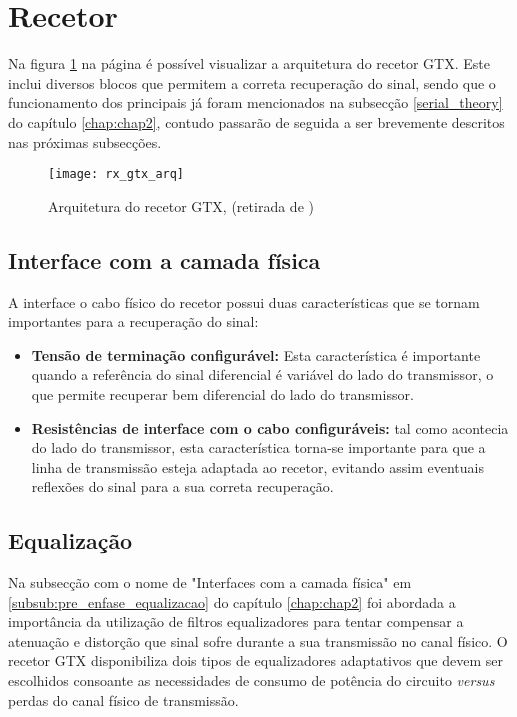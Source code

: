 \section{Recetor} \label{sec:_rx_gtx}
Na figura \ref{fig:gtx_rx_arq} na página \pageref{fig:gtx_rx_arq} é possível visualizar a arquitetura do recetor GTX. Este inclui diversos blocos que permitem a correta recuperação do sinal, sendo que o funcionamento dos principais já foram mencionados na subsecção \ref{serial_theory} do capítulo \ref{chap:chap2}, contudo passarão de seguida a ser brevemente descritos nas próximas subsecções. 

\begin{figure}[h!]
	\begin{center}
		\leavevmode
		\texttt{[image: rx\_gtx\_arq]}
		\centering
		\caption[Arquitetura do recetor GTX]{Arquitetura do recetor GTX, (retirada de \cite{R011})}
		\label{fig:gtx_rx_arq}
	\end{center}
\end{figure}
	

\subsection{Interface com a camada física}

A interface o cabo físico do recetor possui duas características que se tornam importantes para a recuperação do sinal:
\begin{itemize}
	\item \textbf{Tensão de terminação configurável:} Esta característica é importante quando a referência do sinal diferencial é variável do lado do transmissor, o que permite recuperar bem diferencial do lado do transmissor.
	\item \textbf{Resistências de interface com o cabo configuráveis:} tal como acontecia do lado do transmissor, esta característica torna-se importante para que a linha de transmissão esteja adaptada ao recetor, evitando assim eventuais reflexões do sinal para a sua correta recuperação.


\end{itemize}


\subsection{Equalização} \label{subsub:rx_equalização}

Na subsecção com o nome de "Interfaces com a camada física" em \ref{subsub:pre_enfase_equalizacao} do capítulo \ref{chap:chap2} foi abordada a importância da utilização de filtros equalizadores para tentar compensar a atenuação e distorção que sinal sofre durante a sua transmissão no canal físico. O recetor GTX disponibiliza dois tipos de equalizadores adaptativos que devem ser escolhidos consoante as necessidades de consumo de potência do circuito \textit{versus} perdas do canal físico de transmissão.

